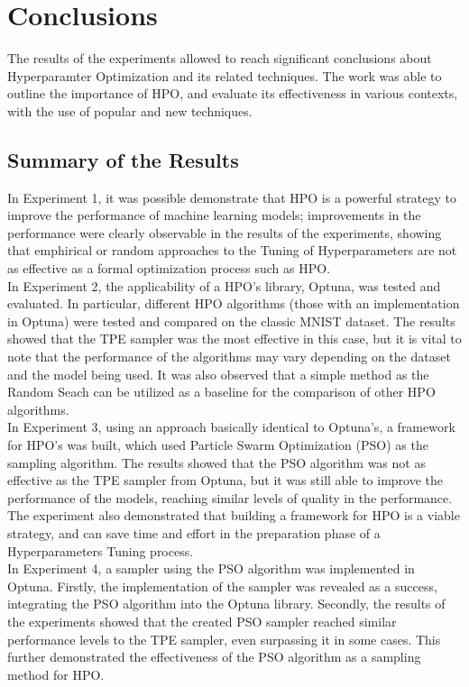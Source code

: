 \chapter{Conclusions}

The results of the experiments allowed to reach significant conclusions about Hyperparamter Optimization and its related techniques. The work was able to outline the importance of HPO, and evaluate its effectiveness in various contexts, with the use of popular and new techniques.

\section{Summary of the Results}

In Experiment 1, it was possible demonstrate that HPO is a powerful strategy to improve the performance of machine learning models; improvements in the performance were clearly observable in the results of the experiments, showing that emphirical or random approaches to the Tuning of Hyperparameters are not as effective as a formal optimization process such as HPO.
\\[0.3cm]In Experiment 2, the applicability of a HPO's library, Optuna, was tested and evaluated. In particular, different HPO algorithms (those with an implementation in Optuna) were tested and compared on the classic MNIST dataset. The results showed that the TPE sampler was the most effective in this case, but it is vital to note that the performance of the algorithms may vary depending on the dataset and the model being used. It was also observed that a simple method as the Random Seach can be utilized as a baseline for the comparison of other HPO algorithms.
\\[0.3cm]In Experiment 3, using an approach basically identical to Optuna's, a framework for HPO's was built, which used Particle Swarm Optimization (PSO) as the sampling algorithm. The results showed that the PSO algorithm was not as effective as the TPE sampler from Optuna, but it was still able to improve the performance of the models, reaching similar levels of quality in the performance. The experiment also demonstrated that building a framework for HPO is a viable strategy, and can save time and effort in the preparation phase of a Hyperparameters Tuning process.
\\[0.3cm]In Experiment 4, a sampler using the PSO algorithm was implemented in Optuna. Firstly, the implementation of the sampler was revealed as a success, integrating the PSO algorithm into the Optuna library. Secondly, the results of the experiments showed that the created PSO sampler reached similar performance levels to the TPE sampler, even surpassing it in some cases. This further demonstrated the effectiveness of the PSO algorithm as a sampling method for HPO.
